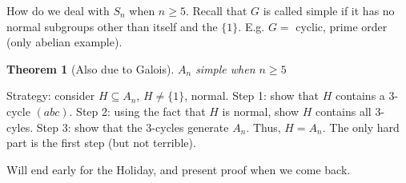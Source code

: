 \documentclass{article}
\theoremstyle{plain}
\newtheorem{theorem}{Theorem}
\theoremstyle{remark}
\begin{document}
How do we deal with $S_n$ when $n\geq 5$.
Recall that $G$ is called simple if it has no normal subgroups
other than itself and the $\{1\}$.
E.g. $G = $ cyclic, prime order (only abelian example).
\begin{theorem}[Also due to Galois]
	$A_n$ simple when $n \geq 5$
\end{theorem}
Strategy: consider $H \subseteq A_n$, $H \neq \{1\}$, normal.
Step 1: show that $H$ contains a $3$-cycle $(abc)$.
Step 2: using the fact that $H$ is normal, show $H$ contains all $3$-cyles.
Step 3: show that the $3$-cycles generate $A_n$.
Thus, $H = A_n$.
The only hard part is the first step (but not terrible).

Will end early for the Holiday, and present proof when we come back.
\end{document}
